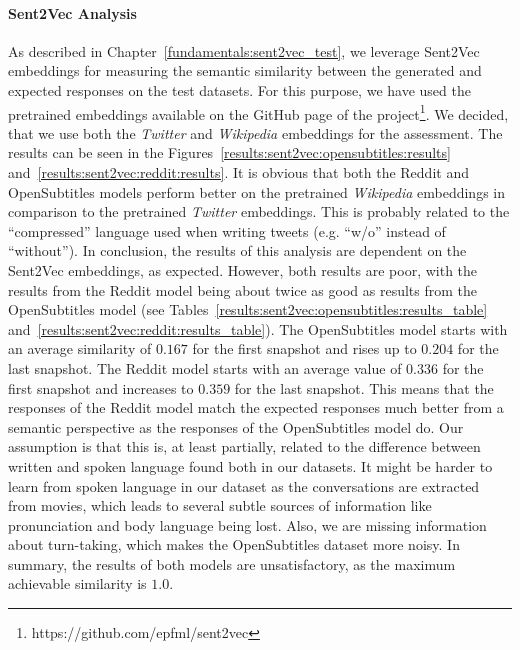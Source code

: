 \paragraph{Sent2Vec Analysis} As described in Chapter~\ref{fundamentals:sent2vec_test}, we leverage Sent2Vec embeddings for measuring the semantic similarity between the generated and expected responses on the test datasets. For this purpose, we have used the pretrained embeddings available on the GitHub page of the project\footnote{https://github.com/epfml/sent2vec}. We decided, that we use both the \emph{Twitter} and \emph{Wikipedia} embeddings for the assessment. The results can be seen in the Figures~\ref{results:sent2vec:opensubtitles:results} and~\ref{results:sent2vec:reddit:results}. It is obvious that both the Reddit and OpenSubtitles models perform better on the pretrained \emph{Wikipedia} embeddings in comparison to the pretrained \emph{Twitter} embeddings. This is probably related to the ``compressed'' language used when writing tweets (e.g. ``w/o'' instead of ``without''). In conclusion, the results of this analysis are dependent on the Sent2Vec embeddings, as expected. However, both results are poor, with the results from the Reddit model being about twice as good as results from the OpenSubtitles model (see Tables~\ref{results:sent2vec:opensubtitles:results_table} and~\ref{results:sent2vec:reddit:results_table}). The OpenSubtitles model starts with an average similarity of $0.167$ for the first snapshot and rises up to $0.204$ for the last snapshot. The Reddit model starts with an average value of $0.336$ for the first snapshot and increases to $0.359$ for the last snapshot. This means that the responses of the Reddit model match the expected responses much better from a semantic perspective as the responses of the OpenSubtitles model do. Our assumption is that this is, at least partially, related to the difference between written and spoken language found both in our datasets. It might be harder to learn from spoken language in our dataset as the conversations are extracted from movies, which leads to several subtle sources of information like pronunciation and body language being lost. Also, we are missing information about turn-taking, which makes the OpenSubtitles dataset more noisy. In summary, the results of both models are unsatisfactory, as the maximum achievable similarity is $1.0$.

